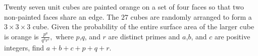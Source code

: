 Twenty seven unit cubes are painted orange on a set of four faces so that two non-painted faces share an edge. The $27$ cubes are randomly arranged to form a $3\times 3 \times 3$ cube. Given the probability of the entire surface area of the larger cube is orange is $\frac{p^a}{q^br^c},$ where $p$,$q$, and $r$ are distinct primes and $a$,$b$, and $c$ are positive integers, find $a+b+c+p+q+r$.